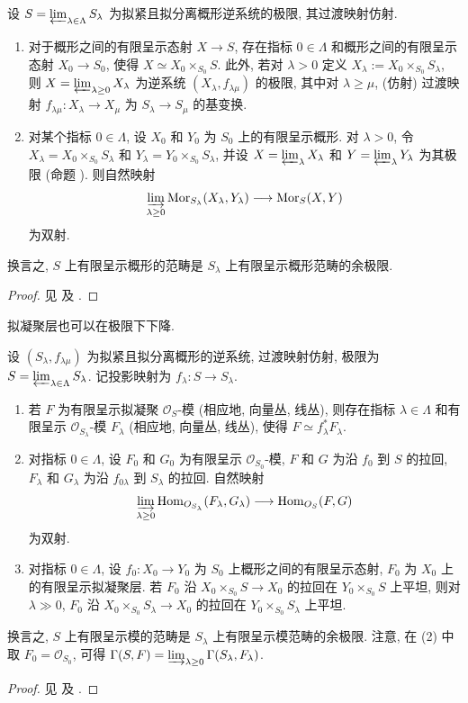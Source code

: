 \begin{proposition}[极限下态射的下降]\label{src:B.3.3}
设 $S=\varprojlim_{\lambda\in\Lambda}S_\lambda$ 为拟紧且拟分离概形逆系统的极限, 其过渡映射仿射.
\begin{enumerate}[(1)]
\item 对于概形之间的有限呈示态射 $X\to S$, 存在指标 $0\in\Lambda$ 和概形之间的有限呈示态射 $X_0\to S_0$, 使得 $X\simeq X_0\times_{S_0}S$. 此外, 若对 $\lambda>0$ 定义 $X_\lambda:=X_0\times_{S_0}S_\lambda$, 则 $X=\varprojlim_{\lambda\geq0}X_\lambda$ 为逆系统 $(X_\lambda,f_{\lambda\mu})$ 的极限, 其中对 $\lambda\geq\mu$, (仿射) 过渡映射 $f_{\lambda\mu}:X_\lambda\to X_\mu$ 为 $S_\lambda\to S_\mu$ 的基变换.
\item 对某个指标 $0\in\Lambda$, 设 $X_0$ 和 $Y_0$ 为 $S_0$ 上的有限呈示概形. 对 $\lambda>0$, 令 $X_\lambda=X_0\times_{S_0}S_\lambda$ 和 $Y_\lambda=Y_0\times_{S_0}S_\lambda$, 并设 $X=\varprojlim_\lambda X_\lambda$ 和 $Y=\varprojlim_\lambda Y_\lambda$ 为其极限 (命题 ). 则自然映射
\[
\varinjlim_{\lambda\geq0}\operatorname{Mor}_{S_\lambda}(X_\lambda,Y_\lambda)
\longrightarrow\operatorname{Mor}_S(X,Y)
\]
为双射.
\end{enumerate}
\end{proposition}
换言之, $S$ 上有限呈示概形的范畴是 $S_\lambda$ 上有限呈示概形范畴的余极限.
\begin{proof}
见 \cite[IV.$8.8$]{EGA} 及 \cite[Tag 01ZM]{SP}.
\end{proof}
\newpage
拟凝聚层也可以在极限下下降.
\begin{proposition}[极限下拟凝聚层的下降]\label{src:B.3.4}
设 $(S_\lambda,f_{\lambda\mu})$ 为拟紧且拟分离概形的逆系统, 过渡映射仿射, 极限为 $S=\varprojlim_{\lambda\in\Lambda}S_\lambda$. 记投影映射为 $f_\lambda:S\to S_\lambda$.
\begin{enumerate}[(1)]
\item 若 $F$ 为有限呈示拟凝聚 $\mathcal O_S$-模 (相应地, 向量丛, 线丛), 则存在指标 $\lambda\in\Lambda$ 和有限呈示 $\mathcal O_{S_\lambda}$-模 $F_\lambda$ (相应地, 向量丛, 线丛), 使得 $F\simeq f_\lambda^*F_\lambda$.
\item 对指标 $0\in\Lambda$, 设 $F_0$ 和 $G_0$ 为有限呈示 $\mathcal O_{S_0}$-模, $F$ 和 $G$ 为沿 $f_0$ 到 $S$ 的拉回, $F_\lambda$ 和 $G_\lambda$ 为沿 $f_{0\lambda}$ 到 $S_\lambda$ 的拉回. 自然映射
\[
\varinjlim_{\lambda\geq0}\operatorname{Hom}_{\mathcal O_{S_\lambda}}(F_\lambda,G_\lambda)
\longrightarrow\operatorname{Hom}_{\mathcal O_S}(F,G)
\]
为双射.
\item 对指标 $0\in\Lambda$, 设 $f_0:X_0\to Y_0$ 为 $S_0$ 上概形之间的有限呈示态射, $F_0$ 为 $X_0$ 上的有限呈示拟凝聚层. 若 $F_0$ 沿 $X_0\times_{S_0}S\to X_0$ 的拉回在 $Y_0\times_{S_0}S$ 上平坦, 则对 $\lambda\gg0$, $F_0$ 沿 $X_0\times_{S_0}S_\lambda\to X_0$ 的拉回在 $Y_0\times_{S_0}S_\lambda$ 上平坦.
\end{enumerate}
\end{proposition}
换言之, $S$ 上有限呈示模的范畴是 $S_\lambda$ 上有限呈示模范畴的余极限. 注意, 在 (2) 中取 $F_0=\mathcal O_{S_0}$, 可得 $\Gamma(S,F)=\varinjlim_{\lambda\geq0}\Gamma(S_\lambda,F_\lambda)$.
\begin{proof}
见 \cite[IV.$8.5.2$]{EGA} 及 \cite[Tags 01ZR, 0B8W 及 05LY]{SP}.
\end{proof}


